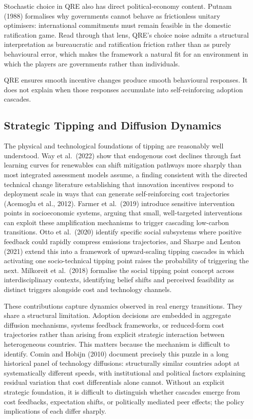 \documentclass[10pt,a4paper]{article}
\begin{document}
Stochastic choice in QRE also has direct political-economy content. Putnam (1988) formalises why governments
cannot behave as frictionless unitary optimisers: international commitments must remain feasible in the
domestic ratification game. Read through that lens, QRE's choice noise admits a structural interpretation as
bureaucratic and ratification friction rather than as purely behavioural error, which makes the framework a
natural fit for an environment in which the players are governments rather than individuals.

QRE ensures smooth incentive changes produce smooth behavioural responses. It does not explain when those responses accumulate into self-reinforcing adoption cascades.

\needspace{12em}
\subsection*{Strategic Tipping and Diffusion Dynamics}

The physical and technological foundations of tipping are reasonably well understood. Way et al.\ (2022)
show that endogenous cost declines through fast learning curves for renewables can shift mitigation
pathways more sharply than most integrated assessment models assume, a finding consistent with the
directed technical change literature establishing that innovation incentives respond to deployment scale in
ways that can generate self-reinforcing cost trajectories (Acemoglu et al., 2012). Farmer et al.\ (2019)
introduce sensitive intervention points in socioeconomic systems, arguing that small, well-targeted
interventions can exploit these amplification mechanisms to trigger cascading low-carbon transitions.
Otto et al.\ (2020) identify specific social subsystems where positive feedback could rapidly compress
emissions trajectories, and Sharpe and Lenton (2021) extend this into a framework of upward-scaling
tipping cascades in which activating one socio-technical tipping point raises the probability of triggering
the next. Milkoreit et al.\ (2018) formalise the social tipping point concept across interdisciplinary
contexts, identifying belief shifts and perceived feasibility as distinct triggers alongside cost and
technology channels.

These contributions capture dynamics observed in real energy transitions. They share a structural
limitation. Adoption decisions are embedded in aggregate diffusion mechanisms, systems feedback
frameworks, or reduced-form cost trajectories rather than arising from explicit strategic interaction
between heterogeneous countries. This matters because the mechanism is difficult to identify. Comin and
Hobijn (2010) document precisely this puzzle in a long historical panel of technology diffusions:
structurally similar countries adopt at systematically different speeds, with institutional and political
factors explaining residual variation that cost differentials alone cannot. Without an explicit strategic
foundation, it is difficult to distinguish whether cascades emerge from cost feedbacks, expectation shifts,
or politically mediated peer effects; the policy implications of each differ sharply.
\end{document}
